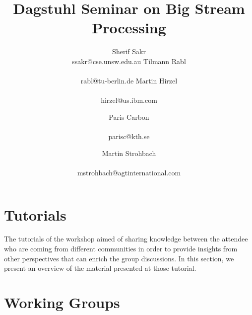 \documentclass[preprint]{sig-alternate-10pt}
\begin{document}
\title{Dagstuhl Seminar on Big Stream Processing}

\newcommand*{\emailn}[1]{\textsf{\normalsize #1}}

\author{
\alignauthor
Sherif Sakr\\
  \emailn{ssakr@cse.unsw.edu.au}
\alignauthor
Tilmann Rabl\\
  \\
  \emailn{rabl@tu-berlin.de}
\alignauthor
Martin Hirzel\\
  \\
  \emailn{hirzel@us.ibm.com}
\and
\alignauthor
Paris Carbon\\
  \\
  \emailn{parisc@kth.se}
\and
\alignauthor
Martin Strohbach\\
  \\
  \emailn{mstrohbach@agtinternational.com}}


\maketitle



\section{Tutorials}
The tutorials of the workshop aimed of sharing knowledge between the attendee who are coming from different communities in order to provide insights from other perspectives that can enrich the group discussions. In this section,
we present an overview of the material presented at those tutorial.





\section{Working Groups}




\balance

\end{document}

